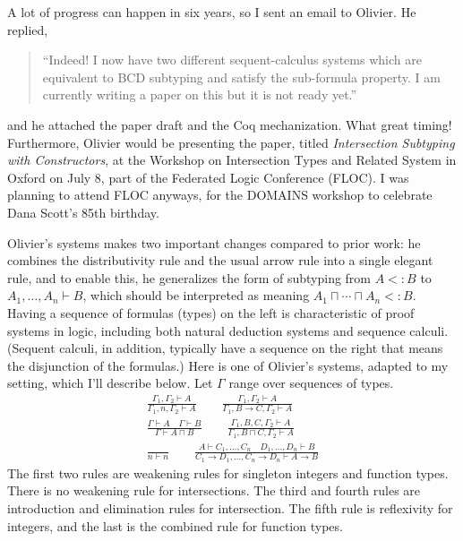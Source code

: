 \documentclass{article}
\begin{document}
A lot of progress can happen in six years, so I sent an email to
Olivier. He replied,
\begin{quote}
``Indeed! I now have two different sequent-calculus systems which are
  equivalent to BCD subtyping and satisfy the sub-formula property.  I
  am currently writing a paper on this but it is not ready yet.''
\end{quote}
and he attached the paper draft and the Coq mechanization. What great
timing!  Furthermore, Olivier would be presenting the paper, titled
\emph{Intersection Subtyping with Constructors}, at the Workshop on
Intersection Types and Related System in Oxford on July 8, part of the
Federated Logic Conference (FLOC). I was planning to attend FLOC
anyways, for the DOMAINS workshop to celebrate Dana Scott's 85th
birthday.

Olivier's systems makes two important changes compared to prior work:
he combines the distributivity rule and the usual arrow rule into a
single elegant rule, and to enable this, he generalizes the form of
subtyping from $A <: B$ to $A_1,\ldots,A_n \vdash B$, which should be
interpreted as meaning $A_1 \sqcap \cdots \sqcap A_n <: B$.  Having a
sequence of formulas (types) on the left is characteristic of proof
systems in logic, including both natural deduction systems and
sequence calculi. (Sequent calculi, in addition, typically have a
sequence on the right that means the disjunction of the formulas.)
Here is one of Olivier's systems, adapted to my setting, which I'll
describe below. Let $\Gamma$ range over sequences of types.
\begin{gather*}
  \frac{\Gamma_1, \Gamma_2 \vdash A}
       {\Gamma_1 , n, \Gamma_2 \vdash A} \qquad
  \frac{\Gamma_1, \Gamma_2 \vdash A}
       {\Gamma_1 , B \to C, \Gamma_2 \vdash A}
   \\[2ex]
   \frac{\Gamma \vdash A \quad \Gamma \vdash B}{\Gamma \vdash A \sqcap B}
   \qquad
   \frac{\Gamma_1,B,C,\Gamma_2 \vdash A}{\Gamma_1,B\sqcap C,\Gamma_2 \vdash A}
   \\[2ex]
   \frac{}{n \vdash n}
   \qquad
   \frac{A \vdash C_1, \ldots, C_n \quad
         D_1, \ldots, D_n \vdash B}
        {C_1\to D_1,\ldots, C_n\to D_n \vdash A \to B}
\end{gather*}
The first two rules are weakening rules for singleton integers and
function types. There is no weakening rule for intersections.  The
third and fourth rules are introduction and elimination rules for
intersection. The fifth rule is reflexivity for integers, and the last
is the combined rule for function types.
\end{document}
